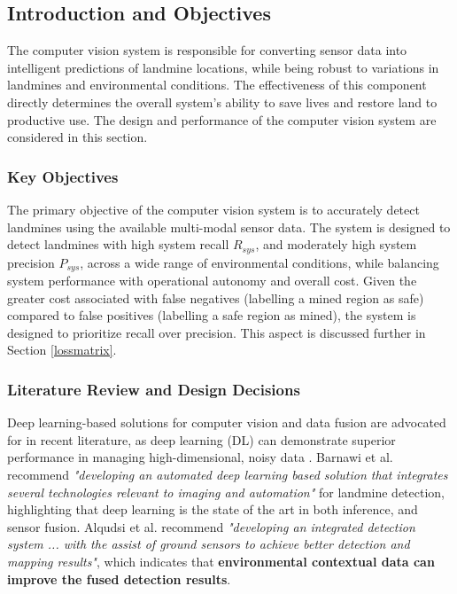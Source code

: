 \subsection{Introduction and Objectives} \label{compvis_intro}

     \noindent The computer vision system is responsible for converting sensor data into intelligent predictions of landmine locations, while being robust to variations in landmines and environmental conditions. The effectiveness of this component directly determines the overall system’s ability to save lives and restore land to productive use. The design and performance of the computer vision system are considered in this section. 
     
    \subsubsection{Key Objectives}
    
        \noindent The primary objective of the computer vision system is to accurately detect landmines using the available multi-modal sensor data. The system is designed to detect landmines with high system recall $R_{sys}$, and moderately high system precision $P_{sys}$, across a wide range of environmental conditions, while balancing system performance with operational autonomy and overall cost. Given the greater cost associated with false negatives (labelling a mined region as safe) compared to false positives (labelling a safe region as mined), the system is designed to prioritize recall over precision. This aspect is discussed further in Section \ref{lossmatrix}.

    \subsubsection{Literature Review and Design Decisions} 
    
        Deep learning-based solutions for computer vision and data fusion are advocated for in recent literature, as deep learning (DL) can demonstrate superior performance in managing high-dimensional, noisy data \cite{Li2023Robust}. Barnawi et al. \cite{barnawi2022review} recommend \textit{"developing an automated deep learning based solution that integrates several technologies relevant to imaging and automation"} for landmine detection, highlighting that deep learning is the state of the art in both inference, and sensor fusion. Alqudsi et al. \cite{alqudsi2021review} recommend \textit{"developing an integrated detection system ... with the assist of ground sensors to achieve better detection and mapping results"}, which indicates that \textbf{environmental contextual data can improve the fused detection results}.
    
